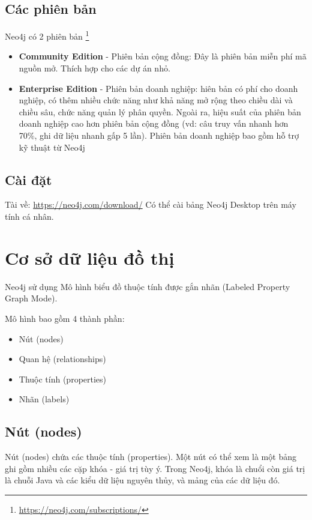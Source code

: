 \subsection{Các phiên bản}
Neo4j có 2 phiên bản \footnote{\url{https://neo4j.com/subscriptions/}}

\begin{itemize}
\item \textbf{Community Edition} - Phiên bản cộng đồng: Đây là phiên bản miễn phí mã nguồn mở. Thích hợp cho các dự án nhỏ.
\item \textbf{Enterprise Edition} - Phiên bản doanh nghiệp: hiên bản có phí cho doanh nghiệp, có thêm nhiều chức năng như khả năng mở rộng theo chiều dài và chiều sâu, chức năng quản lý phân quyền. Ngoài ra, hiệu suất của phiên bản doanh nghiệp cao hơn phiên bản cộng đồng (vd: câu truy vấn nhanh hơn 70\%, ghi dữ liệu nhanh gấp 5 lần). Phiên bản doanh nghiệp bao gồm hỗ trợ kỹ thuật từ Neo4j 
\end{itemize}

\subsection{Cài đặt}
Tài về:  \url{https://neo4j.com/download/}  
Có thể cài bảng Neo4j Desktop trên máy tính cá nhân. 


\section{Cơ sở dữ liệu đồ thị}
Neo4j sử dụng Mô hình biểu đồ thuộc tính được gắn nhãn (Labeled Property Graph Mode). 

Mô hình bao gồm 4 thành phần: 

\begin{itemize}
\item Nút (nodes)
\item Quan hệ (relationships)
\item Thuộc tính  (properties)
\item Nhãn (labels)
\end{itemize}

\subsection{Nút (nodes)}
Nút (nodes) chứa các thuộc tính (properties). Một nút có thể xem là một bảng ghi gồm nhiều các cặp khóa - giá trị tùy ý. Trong Neo4j, khóa là chuổi còn giá trị là chuỗi Java và các kiểu dữ liệu nguyên thủy, và mảng của các dữ liệu đó. 

